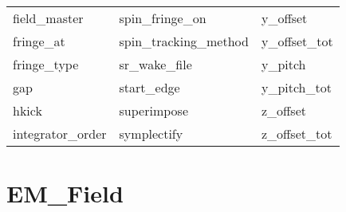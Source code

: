 \begin{tabular}{lll}
field_master                & spin_fringe_on              & y_offset                    \\
fringe_at                   & spin_tracking_method        & y_offset_tot                \\
fringe_type                 & sr_wake_file                & y_pitch                     \\
gap                         & start_edge                  & y_pitch_tot                 \\
hkick                       & superimpose                 & z_offset                    \\
integrator_order            & symplectify                 & z_offset_tot                \\
 \bottomrule
 \end{tabular}
 \vfill
 
 \section{EM_Field}
 \label{s:list.em.field}
 
